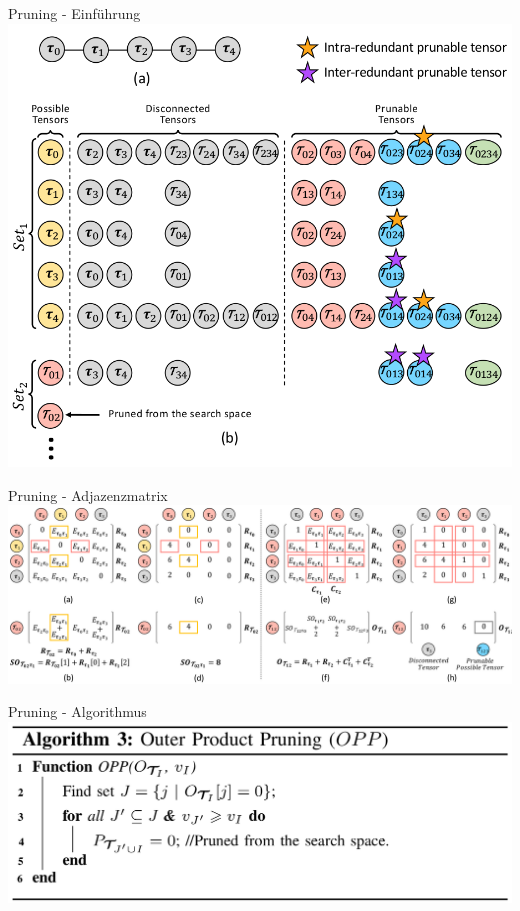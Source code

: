\documentclass{beamer}
\begin{document}
\begin{frame}{Pruning - Einführung}
	\includegraphics[scale=0.25]{figure-6}
\end{frame}

\begin{frame}{Pruning - Adjazenzmatrix}
	\includegraphics[scale=0.2]{figure-5}
\end{frame}

\begin{frame}{Pruning - Algorithmus}
	\includegraphics[scale=0.25]{algorithm-3}
\end{frame}
\end{document}
